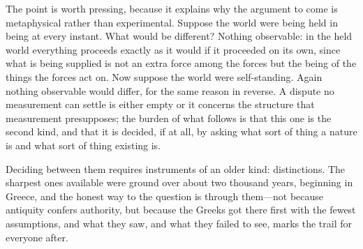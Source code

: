 The point is worth pressing, because it explains why the argument to come is metaphysical rather than experimental. Suppose the world were being held in being at every instant. What would be different? Nothing observable: in the held world everything proceeds exactly as it would if it proceeded on its own, since what is being supplied is not an extra force among the forces but the being of the things the forces act on. Now suppose the world were self-standing. Again nothing observable would differ, for the same reason in reverse. A dispute no measurement can settle is either empty or it concerns the structure that measurement presupposes; the burden of what follows is that this one is the second kind, and that it is decided, if at all, by asking what sort of thing a nature is and what sort of thing existing is.

Deciding between them requires instruments of an older kind: distinctions. The sharpest ones available were ground over about two thousand years, beginning in Greece, and the honest way to the question is through them---not because antiquity confers authority, but because the Greeks got there first with the fewest assumptions, and what they saw, and what they failed to see, marks the trail for everyone after.
